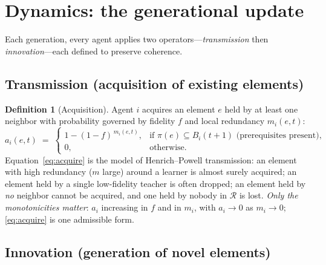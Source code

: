 \documentclass[11pt,letterpaper]{article}
\theoremstyle{definition}
\newtheorem{definition}{Definition}[section]
\theoremstyle{plain}
\newcommand{\R}{\mathcal{R}}
\newcommand{\pre}{\pi}
\begin{document}
\section{Dynamics: the generational update}\label{sec:dynamics}

Each generation, every agent applies two operators---\emph{transmission} then
\emph{innovation}---each defined to preserve coherence.

\subsection{Transmission (acquisition of existing elements)}

\begin{definition}[Acquisition]\label{def:acquire}
Agent $i$ acquires an element $e$ held by at least one neighbor with probability
governed by fidelity $f$ and local redundancy $m_i(e,t)$:
\begin{equation}\label{eq:acquire}
  a_i(e,t) \;=\;
  \begin{cases}
    1 - (1-f)^{\,m_i(e,t)}, & \text{if } \pre(e)\subseteq B_i(t{+}1)
      \text{ (prerequisites present)},\\[2pt]
    0, & \text{otherwise.}
  \end{cases}
\end{equation}
Equation~\eqref{eq:acquire} is the model of Henrich--Powell transmission: an
element with high redundancy ($m$ large) around a learner is almost surely
acquired; an element held by a single low-fidelity teacher is often dropped; an
element held by \emph{no} neighbor cannot be acquired, and one held by nobody in
$\R$ is lost. \emph{Only the monotonicities matter}: $a_i$ increasing in $f$ and
in $m_i$, with $a_i\to 0$ as $m_i\to 0$; \eqref{eq:acquire} is one admissible form.
\end{definition}

\subsection{Innovation (generation of novel elements)}
\end{document}
